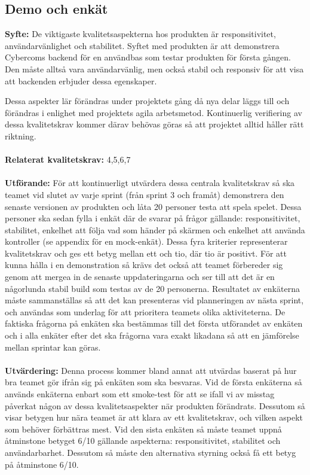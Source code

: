 \documentclass[10pt]{article}
\begin{document}
	\subsection{Demo och enkät}
	\textbf{Syfte:}	De viktigaste kvalitetsaspekterna hos produkten är responsitivitet, användarvänlighet och stabilitet. Syftet med produkten är att demonstrera Cybercoms backend för en användbas som testar produkten för första gången. Den måste alltså vara användarvänlig, men också stabil och responsiv för att visa att backenden erbjuder dessa egenskaper.
	
	Dessa aspekter lär förändras under projektets gång då nya delar läggs till och förändras i enlighet med projektets agila arbetsmetod. Kontinuerlig verifiering av dessa kvalitetskrav kommer därav behövas göras så att projektet alltid håller rätt riktning.
	\\\\
	\textbf{Relaterat kvalitetskrav:} 4,5,6,7
	\\\\
	\textbf{Utförande:} För att kontinuerligt utvärdera dessa centrala kvalitetskrav så ska teamet vid slutet av varje sprint (från sprint 3 och framåt) demonstrera den senaste versionen av produkten och låta 20 personer testa att spela spelet. Dessa personer ska sedan fylla i enkät där de svarar på frågor gällande: responsitivitet, stabilitet, enkelhet att följa vad som händer på skärmen och enkelhet att använda kontroller (se appendix för en mock-enkät). Dessa fyra kriterier representerar kvalitetskrav och ges ett betyg mellan ett och tio, där tio är positivt. För att kunna hålla i en demonstration så krävs det också att teamet förbereder sig genom att mergea in de senaste uppdateringarna och ser till att det är en någorlunda stabil build som testas av de 20 personerna. Resultatet av enkäterna måste sammanställas så att det kan presenteras vid planneringen av nästa sprint, och användas som underlag för att prioritera teamets olika aktiviteterna. De faktiska frågorna på enkäten ska bestämmas till det första utförandet av enkäten och i alla enkäter efter det ska frågorna vara exakt likadana så att en jämförelse mellan sprintar kan göras.
	\\\\
	\textbf{Utvärdering:} Denna process kommer bland annat att utvärdas baserat på hur bra teamet gör ifrån sig på enkäten som ska besvaras. Vid de första enkäterna så används enkäterna enbart som ett smoke-test för att se ifall vi av misstag påverkat någon av dessa kvalitetsaspekter när produkten förändrats. Dessutom så visar betygen hur nära teamet är att klara av ett kvalitetskrav, och vilken aspekt som behöver förbättras mest. Vid den sista enkäten så måste teamet uppnå åtminstone betyget 6/10 gällande aspekterna: responsitivitet, stabilitet och användarbarhet. Dessutom så måste den alternativa styrning också få ett betyg på åtminstone 6/10.
\end{document}
